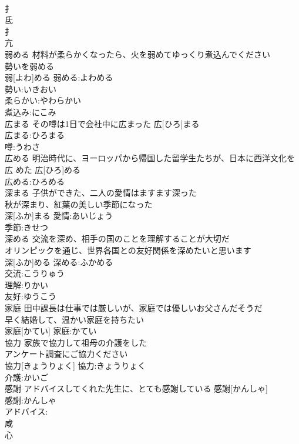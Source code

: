 \documentclass[8pt]{extreport}
\begin{document}
\begin{CJK}{UTF8}{min}
\\	扌 
\\	氐 
\\	扌 
\\	亢 
\\	弱める	材料が柔らかくなったら、火を弱めてゆっくり煮込んでください 
\\	勢いを弱める 
\\	弱[よわ]める			弱める:よわめる
\\	勢い:いきおい
\\	柔らかい:やわらかい
\\	煮込み:にこみ
\\	広まる	その噂は1日で会社中に広まった	広[ひろ]まる	
\\	広まる:ひろまる
\\	噂:うわさ
\\	広める	明治時代に、ヨーロッパから帰国した留学生たちが、日本に西洋文化を広 めた	広[ひろ]める	
\\	広める:ひろめる
\\	深まる	子供ができた、二人の愛情はますます深った 
\\	秋が深まり、紅葉の美しい季節になった 
\\	深[ふか]まる			愛情:あいじょう
\\	季節:きせつ
\\	深める	交流を深め、相手の国のことを理解することが大切だ 
\\	オリンピックを通じ、世界各国との友好関係を深めたいと思います 
\\	深[ふか]める			深める:ふかめる
\\	交流:こうりゅう
\\	理解:りかい
\\	友好:ゆうこう
\\	家庭	田中課長は仕事では厳しいが、家庭では優しいお父さんだそうだ 
\\	早く結婚して、温かい家庭を持ちたい 
\\	家庭[かてい]			家庭:かてい
\\	協力	家族で協力して祖母の介護をした 
\\	アンケート調査にご協力ください 
\\	協力[きょうりょく]			協力:きょうりょく
\\	介護:かいご
\\	感謝	アドバイスしてくれた先生に、とても感謝している	感謝[かんしゃ]	
\\	感謝:かんしゃ
\\	アドバイス:
\\	咸 
\\	心 

\end{CJK}
\end{document}
